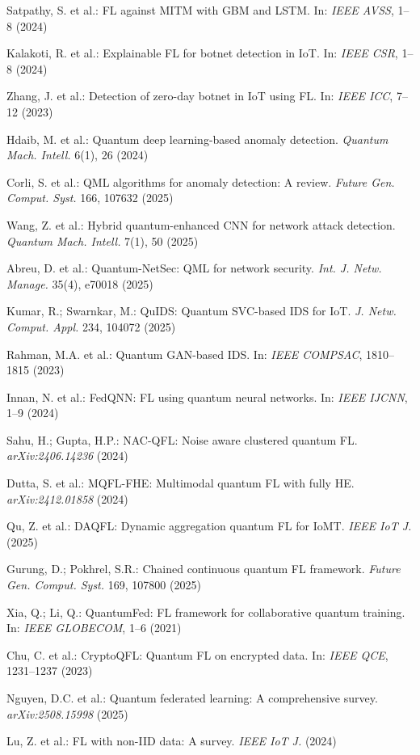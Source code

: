 \documentclass[a4paper]{article}
\begin{document}
\begin{enumerate}[leftmargin=0.8cm, itemsep=0pt, parsep=0pt, label={[\arabic*]}]
\item Satpathy, S. et al.: FL against MITM with GBM and LSTM. In: \textit{IEEE AVSS}, 1--8 (2024)
\item Kalakoti, R. et al.: Explainable FL for botnet detection in IoT. In: \textit{IEEE CSR}, 1--8 (2024)
\item Zhang, J. et al.: Detection of zero-day botnet in IoT using FL. In: \textit{IEEE ICC}, 7--12 (2023)
\item Hdaib, M. et al.: Quantum deep learning-based anomaly detection. \textit{Quantum Mach. Intell.} 6(1), 26 (2024)
\item Corli, S. et al.: QML algorithms for anomaly detection: A review. \textit{Future Gen. Comput. Syst.} 166, 107632 (2025)
\item Wang, Z. et al.: Hybrid quantum-enhanced CNN for network attack detection. \textit{Quantum Mach. Intell.} 7(1), 50 (2025)
\item Abreu, D. et al.: Quantum-NetSec: QML for network security. \textit{Int. J. Netw. Manage.} 35(4), e70018 (2025)
\item Kumar, R.; Swarnkar, M.: QuIDS: Quantum SVC-based IDS for IoT. \textit{J. Netw. Comput. Appl.} 234, 104072 (2025)
\item Rahman, M.A. et al.: Quantum GAN-based IDS. In: \textit{IEEE COMPSAC}, 1810--1815 (2023)
\item Innan, N. et al.: FedQNN: FL using quantum neural networks. In: \textit{IEEE IJCNN}, 1--9 (2024)
\item Sahu, H.; Gupta, H.P.: NAC-QFL: Noise aware clustered quantum FL. \textit{arXiv:2406.14236} (2024)
\item Dutta, S. et al.: MQFL-FHE: Multimodal quantum FL with fully HE. \textit{arXiv:2412.01858} (2024)
\item Qu, Z. et al.: DAQFL: Dynamic aggregation quantum FL for IoMT. \textit{IEEE IoT J.} (2025)
\item Gurung, D.; Pokhrel, S.R.: Chained continuous quantum FL framework. \textit{Future Gen. Comput. Syst.} 169, 107800 (2025)
\item Xia, Q.; Li, Q.: QuantumFed: FL framework for collaborative quantum training. In: \textit{IEEE GLOBECOM}, 1--6 (2021)
\item Chu, C. et al.: CryptoQFL: Quantum FL on encrypted data. In: \textit{IEEE QCE}, 1231--1237 (2023)
\item Nguyen, D.C. et al.: Quantum federated learning: A comprehensive survey. \textit{arXiv:2508.15998} (2025)
\item Lu, Z. et al.: FL with non-IID data: A survey. \textit{IEEE IoT J.} (2024)

\end{enumerate}
\end{document}
